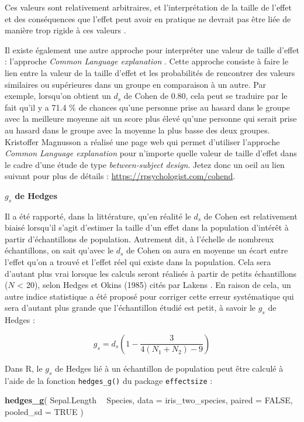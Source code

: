 \documentclass[
  french,
]{book}
\newenvironment{Shaded}{\begin{snugshade}}{\end{snugshade}}
\newcommand{\DataTypeTok}[1]{\textcolor[rgb]{0.13,0.29,0.53}{#1}}
\newcommand{\KeywordTok}[1]{\textcolor[rgb]{0.13,0.29,0.53}{\textbf{#1}}}
\newcommand{\NormalTok}[1]{#1}
\newcommand{\OperatorTok}[1]{\textcolor[rgb]{0.81,0.36,0.00}{\textbf{#1}}}
\newcommand{\OtherTok}[1]{\textcolor[rgb]{0.56,0.35,0.01}{#1}}
\newcommand{\StringTok}[1]{\textcolor[rgb]{0.31,0.60,0.02}{#1}}
\begin{document}
Ces valeurs sont relativement arbitraires, et l'interprétation de la taille de l'effet et des conséquences que l'effet peut avoir en pratique ne devrait pas être liée de manière trop rigide à ces valeurs \autocite{lakensCalculatingReportingEffect2013}.

Il existe également une autre approche pour interpréter une valeur de taille d'effet : l'approche \emph{Common Language explanation} \autocite{lakensCalculatingReportingEffect2013}. Cette approche consiste à faire le lien entre la valeur de la taille d'effet et les probabilités de rencontrer des valeurs similaires ou supérieures dans un groupe en comparaison à un autre. Par exemple, lorsqu'on obtient un \(d_{s}\) de Cohen de 0.80, cela peut se traduire par le fait qu'il y a 71.4 \% de chances qu'une personne prise au hasard dans le groupe avec la meilleure moyenne ait un score plus élevé qu'une personne qui serait prise au hasard dans le groupe avec la moyenne la plus basse des deux groupes. Kristoffer Magnusson a réalisé une page web qui permet d'utiliser l'approche \emph{Common Language explanation} pour n'importe quelle valeur de taille d'effet dans le cadre d'une étude de type \emph{between-subject design}. Jetez donc un oeil au lien suivant pour plus de détails : \url{https://rpsychologist.com/cohend}.

\textbf{\(g_{s}\) de Hedges}

Il a été rapporté, dans la littérature, qu'en réalité le \(d_{s}\) de Cohen est relativement biaisé lorsqu'il s'agit d'estimer la taille d'un effet dans la population d'intérêt à partir d'échantillons de population. Autrement dit, à l'échelle de nombreux échantillons, on sait qu'avec le \(d_{s}\) de Cohen on aura en moyenne un écart entre l'effet qu'on a trouvé et l'effet réel qui existe dans la population. Cela sera d'autant plus vrai lorsque les calculs seront réalisés à partir de petits échantillons (\(N\) \textless{} 20), selon Hedges et Okins (1985) cités par Lakens \autocite*{lakensCalculatingReportingEffect2013}. En raison de cela, un autre indice statistique a été proposé pour corriger cette erreur systématique qui sera d'autant plus grande que l'échantillon étudié est petit, à savoir le \(g_{s}\) de Hedges :

\[g_{s} = d_{s} (1 - \frac{3}{4(N_{1} + N_{2}) - 9})\]

Dans R, le \(g_{s}\) de Hedges lié à un échantillon de population peut être calculé à l'aide de la fonction \texttt{hedges\_g()} du package \texttt{effectsize} :

\begin{Shaded}
\begin{Highlighting}[]
\KeywordTok{hedges_g}\NormalTok{(}
\NormalTok{  Sepal.Length }\OperatorTok{~}\StringTok{ }\NormalTok{Species,}
  \DataTypeTok{data =}\NormalTok{ iris_two_species, }
  \DataTypeTok{paired =} \OtherTok{FALSE}\NormalTok{, }
  \DataTypeTok{pooled_sd =} \OtherTok{TRUE}
\NormalTok{  )}
\end{Highlighting}
\end{Shaded}
\end{document}
